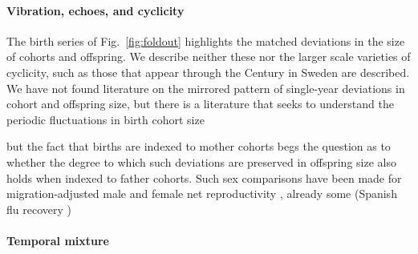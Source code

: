 \documentclass{article}
\begin{document}
\paragraph{Vibration, echoes, and cyclicity}
The birth series of Fig.~\ref{fig:foldout} highlights the matched deviations in the size of cohorts and offspring. We describe neither these nor the larger scale varieties of cyclicity, such as those that appear through the  Century in Sweden are described. We have not found literature on the mirrored pattern of single-year deviations in cohort and offspring size, but there is a literature that seeks to understand the periodic fluctuations in birth cohort size \citep[This literature largely derives from][]{lee1974formal}


but the fact that births are indexed to mother cohorts begs the question as to whether the degree to which such deviations are preserved in offspring size also holds when indexed to father cohorts. Such sex comparisons have been made for migration-adjusted male and female net reproductivity \citep{hyrenius1951reproduction}, already some
(Spanish flu recovery \citep{BobergFazlic2017})

\paragraph{Temporal mixture}


\end{document}
